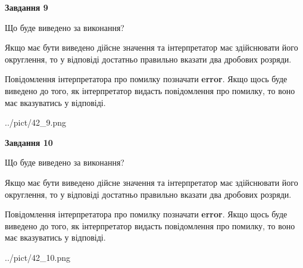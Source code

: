 \documentclass[12pt, ukrainian]{article}
\begin{document}
{\begin {Large}
{\begin {center}\textbf{Завдання 9}\end {center}}\par
Що буде виведено за виконання? \par

Якщо має бути виведено дійсне значення та інтерпретатор має здійснювати його округлення, 
то у відповіді достатньо правильно вказати два дробових розряди.

Повідомлення інтерпретатора про помилку позначати \textbf{error}.
Якщо щось буде виведено до того, як інтерпретатор видасть повідомлення про помилку, 
то воно має вказуватись у відповіді. \par

\begin{center}
	{../pict/42_9.png}
\end{center}
\newpage

{\begin {center}\textbf{Завдання 10}\end {center}}\par
Що буде виведено за виконання? \par

Якщо має бути виведено дійсне значення та інтерпретатор має здійснювати його округлення, 
то у відповіді достатньо правильно вказати два дробових розряди.

Повідомлення інтерпретатора про помилку позначати \textbf{error}.
Якщо щось буде виведено до того, як інтерпретатор видасть повідомлення про помилку, 
то воно має вказуватись у відповіді. \par

\begin{center}
	{../pict/42_10.png}
\end{center}
\newpage

\end {Large}}
\end{document}
